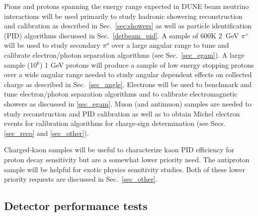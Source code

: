 Pions and protons spanning the energy range expected in DUNE beam neutrino interactions will be used 
primarily to study hadronic showering reconstruction and calibration as described in Sec.~\ref{sec:showers}
 as well as particle identification (PID) algorithms discussed in Sec.~\ref{detbeam_pid}. A sample of 600K
 2~GeV $\pi^+$ will be used to study  secondary $\pi^o$ over a large angular range 
to tune and calibrate electron/photon separation algorithms (see Sec.~\ref{sec_egam}).
A large sample (10$^{6}$) 1 GeV protons will produce a sample of low energy stopping protons over a 
wide angular range needed to study angular
dependent effects on collected charge as described in Sec.~\ref{sec_angle}.
Electrons will be used to benchmark and tune  electron/photon separation algorithms and to calibrate 
electromagnetic showers as discussed in \ref{sec_egam}.
Muon (and antimuon) samples are needed to study reconstruction and PID calibration as well as to obtain 
Michel electron events for calibration  
algorithms for charge-sign determination (see Secs.\ref{sec_reco} and \ref{sec_other}).

Charged-kaon samples will be useful to characterize kaon PID efficiency for proton decay sensitivity but
are a somewhat lower priority need. The antiproton sample
will be helpful for exotic physics sensitivity studies. Both of these lower priority requests are discussed
in Sec.~\ref{sec_other}.


\subsection{Detector performance tests}

